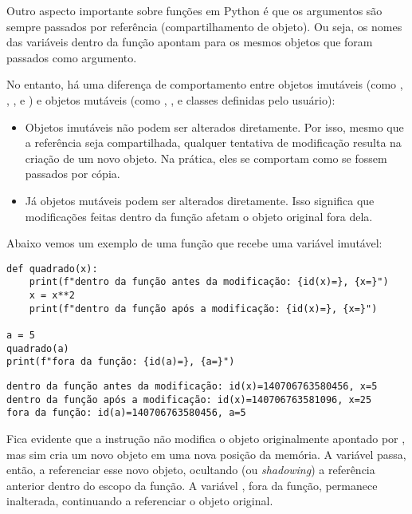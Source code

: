 Outro aspecto importante sobre funções em Python é que os argumentos são sempre passados por referência (compartilhamento de objeto).
Ou seja, os nomes das variáveis dentro da função apontam para os mesmos objetos que foram passados como argumento.

No entanto, há uma diferença de comportamento entre objetos imutáveis
(como , , ,  e ) e objetos mutáveis
(como , ,  e classes definidas pelo usuário):


\begin{itemize}
\item Objetos imutáveis não podem ser alterados diretamente.
Por isso, mesmo que a referência seja compartilhada, qualquer tentativa de modificação resulta na criação de um novo objeto.
Na prática, eles se comportam como se fossem passados por cópia.

\item Já objetos mutáveis podem ser alterados diretamente.
Isso significa que modificações feitas dentro da função afetam o objeto original fora dela.

\end{itemize}

Abaixo vemos um exemplo de uma função que recebe uma variável imutável:
\begin{verbatim}
def quadrado(x):
    print(f"dentro da função antes da modificação: {id(x)=}, {x=}")
    x = x**2
    print(f"dentro da função após a modificação: {id(x)=}, {x=}")

a = 5
quadrado(a)
print(f"fora da função: {id(a)=}, {a=}")
\end{verbatim}
\begin{verbatim}
dentro da função antes da modificação: id(x)=140706763580456, x=5
dentro da função após a modificação: id(x)=140706763581096, x=25
fora da função: id(a)=140706763580456, a=5
\end{verbatim}

Fica evidente que a instrução  não modifica o objeto originalmente apontado por , mas sim
cria um novo objeto em uma nova posição da memória. A variável  passa, então, a referenciar esse novo objeto,
ocultando (ou \emph{shadowing}) a referência anterior dentro do escopo da função. A variável , fora da função,
permanece inalterada, continuando a referenciar o objeto original.

